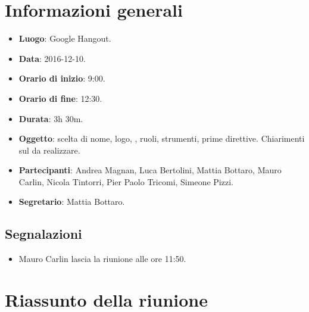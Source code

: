 \documentclass[a4paper,titlepage]{article}
\begin{document}
\maketitle
\begin{diario}
\end{diario}
\newpage
\tableofcontents

\newpage
\section{Informazioni generali}
\label{sec:Informazioni}

\begin{itemize}
  \item \textbf{Luogo}: Google Hangout.
  \item \textbf{Data}: 2016-12-10.
  \item \textbf{Orario di inizio}: 9:00.
  \item \textbf{Orario di fine}: 12:30.
  \item \textbf{Durata}: 3h 30m.
  \item \textbf{Oggetto}: scelta di nome, logo, , ruoli, strumenti, prime direttive. Chiarimenti sul  da realizzare. 
  \item \textbf{Partecipanti}: Andrea Magnan, Luca Bertolini, Mattia Bottaro, Mauro Carlin, Nicola Tintorri, Pier Paolo Tricomi, Simeone Pizzi.
  \item \textbf{Segretario}: Mattia Bottaro.
  
\end{itemize}
\subsection{Segnalazioni}
\begin{itemize}
 \item Mauro Carlin lascia la riunione alle ore 11:50.
\end{itemize}
\section{Riassunto della riunione}
\label{sec:RiassuntoRiunione}
\end{document}
